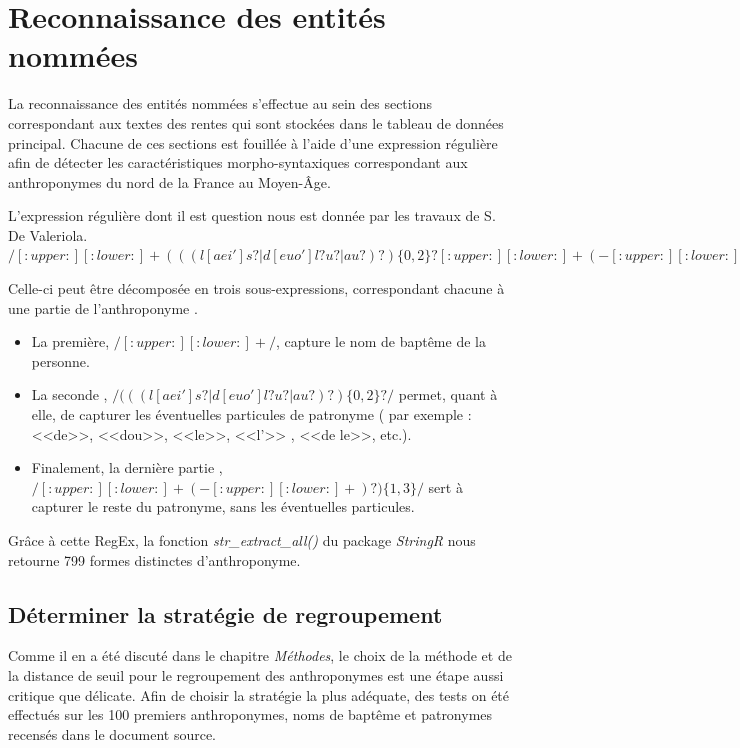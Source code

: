 
\section{Reconnaissance des entités nommées}
La reconnaissance des entités nommées s'effectue au sein des sections correspondant aux textes des rentes qui sont stockées dans le tableau de données principal. Chacune de ces sections est fouillée à l'aide d'une expression régulière afin de détecter les caractéristiques morpho-syntaxiques correspondant aux anthroponymes du  nord  de la France au Moyen-Âge.

L'expression régulière dont il est question nous est donnée par les travaux de S. De Valeriola. \\
 $/[:upper:][:lower:]+ (((l[aei']s?|d[euo']l?u?|au?)?)\{0,2\} ?[:upper:][:lower:]+(-[:upper:][:lower:]+)?)\{1,3\}/$

Celle-ci peut être décomposée en trois sous-expressions, correspondant chacune à une partie de l'anthroponyme \parencite{de_valeriola_lordinateur_2021}.
\begin{itemize}
    \item La première, $/[:upper:][:lower:]+ /$, capture le nom de baptême de la personne.
    \item La seconde , $/(((l[aei']s?|d[euo']l?u?|au?)?)\{0,2\} ?/ $ permet, quant à elle, de capturer les éventuelles particules de patronyme ( par exemple : <<de>>, <<dou>>, <<le>>, <<l'>> , <<de le>>, etc.).
    \item Finalement,  la dernière partie , $ /[:upper:][:lower:]+(-[:upper:][:lower:]+)?)\{1,3\}/ $  sert à capturer le reste du patronyme, sans les éventuelles particules.
\end{itemize}

Grâce à cette RegEx, la fonction \textit{str\_extract\_all()} du package \textit{StringR} nous retourne 799 formes distinctes d'anthroponyme. 


\subsection{Déterminer la stratégie de regroupement}
Comme  il en a été discuté dans le chapitre \textit{Méthodes}, le choix de la méthode et de la distance de seuil pour le regroupement des anthroponymes est une étape aussi critique que délicate.
Afin de choisir la stratégie la plus adéquate, des tests on été effectués sur les 100 premiers anthroponymes, noms de baptême et patronymes recensés dans le document source.

